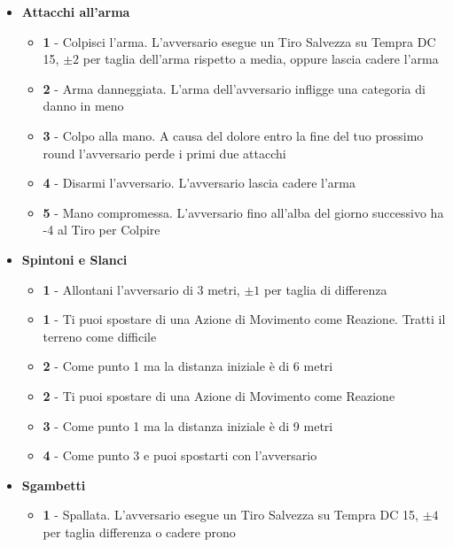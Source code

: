 \begin{multicols}{2}
\begin{itemize}[leftmargin=*]
	\item \textbf{Attacchi all'arma}
	\begin{itemize}[leftmargin=*]
		\setlength{\itemsep}{0pt}
		\item \textbf{1} - Colpisci l'arma. L'avversario esegue un Tiro Salvezza su Tempra DC 15, $ \pm 2 $ per taglia dell'arma rispetto a media, oppure lascia cadere l'arma
		
		\item \textbf{2} - Arma danneggiata. L'arma dell'avversario infligge una categoria di danno in meno
		
		\item \textbf{3} - Colpo alla mano. A causa del dolore entro la fine del tuo prossimo round l'avversario perde i primi due attacchi
		
		\item \textbf{4} - Disarmi l'avversario. L'avversario lascia cadere l'arma
		
		\item \textbf{5} - Mano compromessa. L'avversario fino all'alba del giorno successivo ha -4 al Tiro per Colpire
	\end{itemize}
	
	\item \textbf{Spintoni e Slanci}
	\begin{itemize}[leftmargin=*]
		\setlength{\itemsep}{0pt}
		\item \textbf{1} - Allontani l'avversario di 3 metri, $ \pm 1$ per taglia di differenza
		
		\item \textbf{1} - Ti puoi spostare di una Azione di Movimento come Reazione. Tratti il terreno come difficile
		
		\item \textbf{2} - Come punto 1 ma la distanza iniziale è di 6 metri
		
		\item \textbf{2} - Ti puoi spostare di una Azione di Movimento come Reazione
		
		\item \textbf{3} - Come punto 1 ma la distanza iniziale è di 9 metri
		
		\item \textbf{4} - Come punto 3 e puoi spostarti con l'avversario
	\end{itemize}
	
	\item \textbf{Sgambetti}
	\begin{itemize}[leftmargin=*]
		\setlength{\itemsep}{0pt}
		\item \textbf{1} - Spallata. L'avversario esegue un Tiro Salvezza su Tempra DC 15, $ \pm 4 $ per taglia differenza o cadere prono
		

\end{itemize}
\end{itemize}
\end{multicols}
